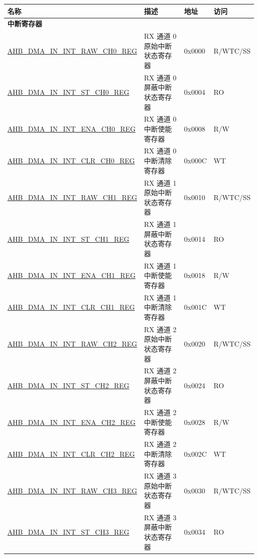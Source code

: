 \begin{longtable}{ | l | l | p{1.3cm} | l | }
\hline\rowcolor{lightgray}
\textbf{名称} & \textbf{描述} & \textbf{地址} & \textbf{访问} \\ \hline
\endhead
\multicolumn{4}{|l|}{\textbf{中断寄存器}} \\ \hline
\hyperref[regdesc:AHBDMAININTRAWCHNREG]{AHB\_DMA\_IN\_INT\_RAW\_CH0\_REG} & RX 通道 0 原始中断状态寄存器 & 0x0000 & R/WTC/SS    \\ \hline
\hyperref[regdesc:AHBDMAININTSTCHNREG]{AHB\_DMA\_IN\_INT\_ST\_CH0\_REG} & RX 通道 0 屏蔽中断状态寄存器 & 0x0004 & RO    \\ \hline
\hyperref[regdesc:AHBDMAININTENACHNREG]{AHB\_DMA\_IN\_INT\_ENA\_CH0\_REG} & RX 通道 0 中断使能寄存器 & 0x0008 & R/W    \\ \hline
\hyperref[regdesc:AHBDMAININTCLRCHNREG]{AHB\_DMA\_IN\_INT\_CLR\_CH0\_REG} & RX 通道 0 中断清除寄存器 & 0x000C & WT    \\ \hline
\hyperref[regdesc:AHBDMAININTRAWCHNREG]{AHB\_DMA\_IN\_INT\_RAW\_CH1\_REG} & RX 通道 1 原始中断状态寄存器 & 0x0010 & R/WTC/SS    \\ \hline
\hyperref[regdesc:AHBDMAININTSTCHNREG]{AHB\_DMA\_IN\_INT\_ST\_CH1\_REG} & RX 通道 1 屏蔽中断状态寄存器 & 0x0014 & RO    \\ \hline
\hyperref[regdesc:AHBDMAININTENACHNREG]{AHB\_DMA\_IN\_INT\_ENA\_CH1\_REG} & RX 通道 1 中断使能寄存器 & 0x0018 & R/W    \\ \hline
\hyperref[regdesc:AHBDMAININTCLRCHNREG]{AHB\_DMA\_IN\_INT\_CLR\_CH1\_REG} & RX 通道 1 中断清除寄存器 & 0x001C & WT    \\ \hline
\hyperref[regdesc:AHBDMAININTRAWCHNREG]{AHB\_DMA\_IN\_INT\_RAW\_CH2\_REG} & RX 通道 2 原始中断状态寄存器 & 0x0020 & R/WTC/SS    \\ \hline
\hyperref[regdesc:AHBDMAININTSTCHNREG]{AHB\_DMA\_IN\_INT\_ST\_CH2\_REG} & RX 通道 2 屏蔽中断状态寄存器 & 0x0024 & RO    \\ \hline
\hyperref[regdesc:AHBDMAININTENACHNREG]{AHB\_DMA\_IN\_INT\_ENA\_CH2\_REG} & RX 通道 2 中断使能寄存器 & 0x0028 & R/W    \\ \hline
\hyperref[regdesc:AHBDMAININTCLRCHNREG]{AHB\_DMA\_IN\_INT\_CLR\_CH2\_REG} & RX 通道 2 中断清除寄存器 & 0x002C & WT    \\ \hline
\hyperref[regdesc:AHBDMAININTRAWCHNREG]{AHB\_DMA\_IN\_INT\_RAW\_CH3\_REG} & RX 通道 3 原始中断状态寄存器 & 0x0030 & R/WTC/SS    \\ \hline
\hyperref[regdesc:AHBDMAININTSTCHNREG]{AHB\_DMA\_IN\_INT\_ST\_CH3\_REG} & RX 通道 3 屏蔽中断状态寄存器 & 0x0034 & RO    \\ \hline

\end{longtable}
